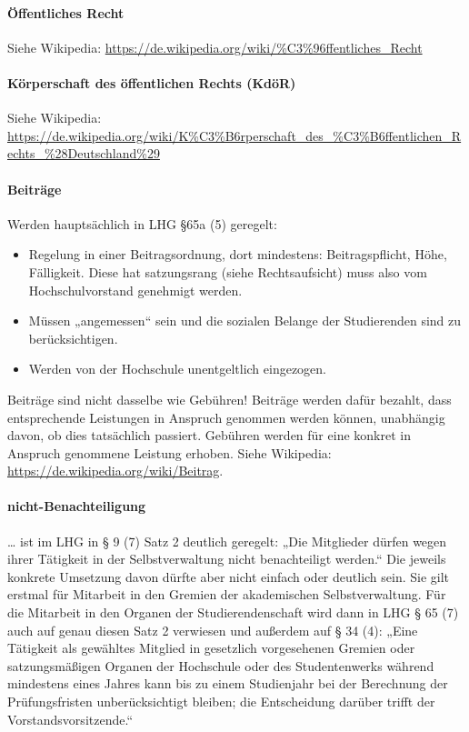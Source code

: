 \documentclass[
10pt,
a4paper,
twoside,								%
titlepage=false,							%
draft=false								%
]{scrartcl}
\begin{document}
\paragraph{Öffentliches Recht}

Siehe Wikipedia: \url{https://de.wikipedia.org/wiki/%C3%96ffentliches_Recht}


\paragraph{Körperschaft des öffentlichen Rechts (KdöR)}

Siehe Wikipedia: \url{https://de.wikipedia.org/wiki/K%C3%B6rperschaft_des_%C3%B6ffentlichen_Rechts_%28Deutschland%29}


\paragraph{Beiträge}


Werden hauptsächlich in LHG §65a (5) geregelt:
\begin{itemize}
	\item Regelung in einer Beitragsordnung, dort mindestens: Beitragspflicht, Höhe, Fälligkeit. Diese hat satzungsrang (siehe Rechtsaufsicht) muss also vom Hochschulvorstand genehmigt werden.
	\item Müssen „angemessen“ sein und die sozialen Belange der Studierenden sind zu berücksichtigen.
	\item Werden von der Hochschule unentgeltlich eingezogen.
\end{itemize}
Beiträge sind nicht dasselbe wie Gebühren! Beiträge werden dafür bezahlt, dass entsprechende Leistungen in Anspruch genommen werden können, unabhängig davon, ob dies tatsächlich passiert. Gebühren werden für eine konkret in Anspruch genommene Leistung erhoben. Siehe Wikipedia: \url{https://de.wikipedia.org/wiki/Beitrag}.


\paragraph{nicht-Benachteiligung}

… ist im LHG in § 9 (7) Satz 2 deutlich geregelt: „Die Mitglieder dürfen wegen ihrer Tätigkeit in der Selbstverwaltung nicht benachteiligt werden.“ Die jeweils konkrete Umsetzung davon dürfte aber nicht einfach oder deutlich sein. Sie gilt erstmal für Mitarbeit in den Gremien der akademischen Selbstverwaltung. Für die Mitarbeit in den Organen der Studierendenschaft wird dann in LHG § 65 (7) auch auf genau diesen Satz 2 verwiesen und außerdem auf § 34 (4): „Eine Tätigkeit als gewähltes Mitglied in gesetzlich vorgesehenen Gremien oder satzungsmäßigen Organen der Hochschule oder des Studentenwerks während mindestens eines Jahres kann bis zu einem Studienjahr bei der Berechnung der Prüfungsfristen unberücksichtigt bleiben; die Entscheidung darüber trifft der Vorstandsvorsitzende.“
\end{document}
